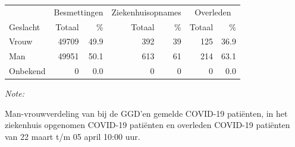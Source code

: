 \documentclass[
  english,
  man,floatsintext]{apa6}
\begin{document}
\begin{table}
\centering\begingroup\fontsize{11}{13}\selectfont

\begin{threeparttable}
\begin{tabular}{lrrrrrr}
\toprule
\multicolumn{1}{c}{ } & \multicolumn{2}{c}{Besmettingen} & \multicolumn{2}{c}{Ziekenhuisopnames} & \multicolumn{2}{c}{Overleden} \\
\cmidrule(l{3pt}r{3pt}){2-3} \cmidrule(l{3pt}r{3pt}){4-5} \cmidrule(l{3pt}r{3pt}){6-7}
Geslacht & Totaal & \% & Totaal & \% & Totaal & \%\\
\midrule
Vrouw & 49709 & 49.9 & 392 & 39 & 125 & 36.9\\
Man & 49951 & 50.1 & 613 & 61 & 214 & 63.1\\
Onbekend & 0 & 0.0 & 0 & 0 & 0 & 0.0\\
\bottomrule
\end{tabular}
\begin{tablenotes}
\item \textit{Note: } 
\item Man-vrouwverdeling van bij de GGD’en gemelde COVID-19 patiënten, in het ziekenhuis opgenomen COVID-19 patiënten en overleden COVID-19 patiënten van 22 maart t/m 05 april 10:00 uur.
\end{tablenotes}
\end{threeparttable}
\endgroup{}
\end{table}
\newpage
\end{document}
